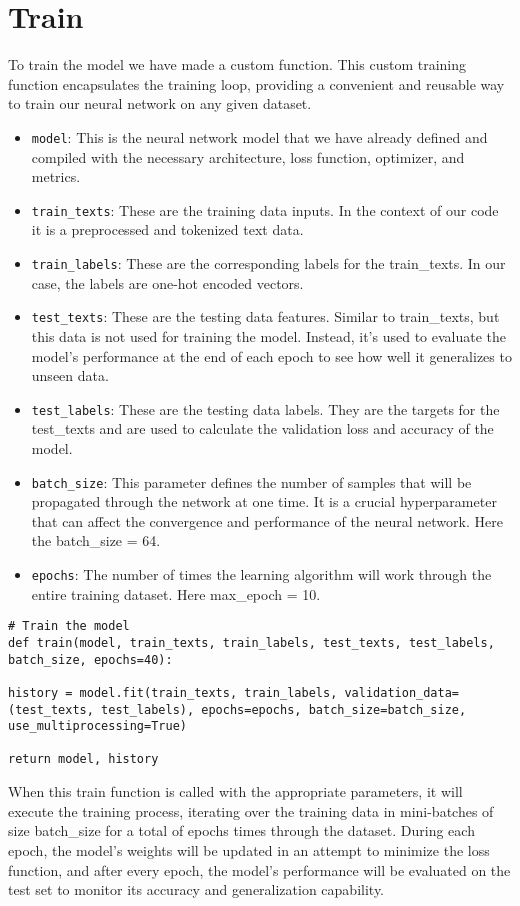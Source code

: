 \section{Train}
To train the model we have made a custom function. This custom training function encapsulates the training loop, providing a convenient and reusable way to train our neural network on any given dataset.

\begin{itemize}
	\item \verb*|model|: This is the neural network model that we have already defined and compiled with the necessary architecture, loss function, optimizer, and metrics.
	
	\item \verb*|train_texts|: These are the training data inputs. In the context of our code it is a preprocessed and tokenized text data.
	
	\item \verb*|train_labels|: These are the corresponding labels for the train\_texts. In our case, the labels are one-hot encoded vectors.
	
	\item \verb*|test_texts|: These are the testing data features. Similar to train\_texts, but this data is not used for training the model. Instead, it's used to evaluate the model's performance at the end of each epoch to see how well it generalizes to unseen data.
	
	\item \verb*|test_labels|: These are the testing data labels. They are the targets for the test\_texts and are used to calculate the validation loss and accuracy of the model.
	
	\item \verb*|batch_size|: This parameter defines the number of samples that will be propagated through the network at one time. It is a crucial hyperparameter that can affect the convergence and performance of the neural network. Here the batch\_size = 64.
	
	\item \verb*|epochs|: The number of times the learning algorithm will work through the entire training dataset. Here max\_epoch = 10.
\end{itemize}

\begin{lstlisting}
# Train the model
def train(model, train_texts, train_labels, test_texts, test_labels, batch_size, epochs=40):

history = model.fit(train_texts, train_labels, validation_data=(test_texts, test_labels), epochs=epochs, batch_size=batch_size, use_multiprocessing=True)

return model, history
\end{lstlisting}

When this train function is called with the appropriate parameters, it will execute the training process, iterating over the training data in mini-batches of size batch\_size for a total of epochs times through the dataset. During each epoch, the model's weights will be updated in an attempt to minimize the loss function, and after every epoch, the model's performance will be evaluated on the test set to monitor its accuracy and generalization capability.